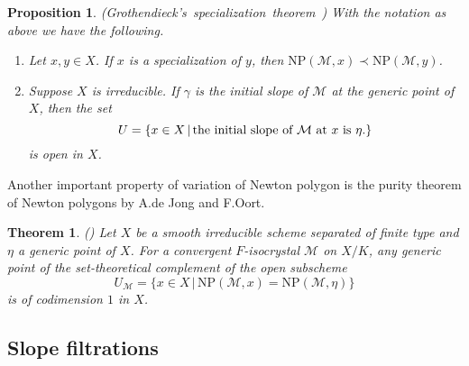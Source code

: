 \documentclass[11pt]{amsart}
\newtheorem{theorem}[Lemma]{Theorem}
\newtheorem{proposition}[Lemma]{Proposition}
\begin{document}
\begin{proposition}\label{sp} \mbox{\rm (Grothendieck's specialization theorem \cite[Theorem 2.3.1]{Kat})} 
With the notation as above we have the following. 
\begin{enumerate}
\item Let $x, y \in X$. If $x$ is a specialization of $y$, then 
$\mathrm{NP}(\mathcal M, x) \prec \mathrm{NP}(\mathcal M, y)$. 
\item Suppose $X$ is irreducible. 
If $\gamma$ is the initial slope of $\mathcal M$ at the generic point of $X$, then the set 
$$
     U = \{ x \in X\, |\, \mbox{\rm the initial slope of $\mathcal M$ at $x$ is $\eta$.} \}
$$
is open in $X$. 
\end{enumerate}
\end{proposition}

Another important property of variation of Newton polygon 
is the purity theorem of Newton polygons by A.de Jong and F.Oort. 

\begin{theorem}\label{Jort} \mbox{\rm (\cite[Theorem 4.1]{DO})} 
Let $X$ be a smooth irreducible scheme separated of finite type and 
$\eta$ a generic point of $X$. For a convergent $F$-isocrystal $\mathcal M$ 
on $X/K$, any generic point of the set-theoretical 
complement of the open subscheme 
$$
  U_{\mathcal M} = \{ x \in X\, |\, \mathrm{NP}(\mathcal M, x) = \mathrm{NP}(\mathcal M, \eta) \}
$$
is of codimension $1$ in $X$. 
\end{theorem}

\subsection{Slope filtrations}\label{frobslope}
\end{document}
